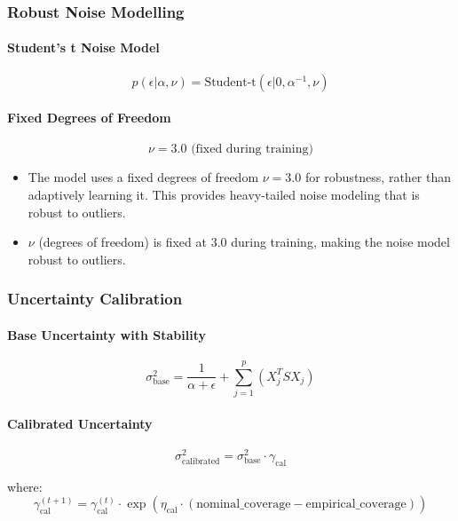 \subsubsection{Robust Noise Modelling}

\paragraph{Student's t Noise Model}
\[
p(\epsilon|\alpha,\nu) = \text{Student-t}(\epsilon|0,\alpha^{-1},\nu)
\]

\paragraph{Fixed Degrees of Freedom}
\[
\nu = 3.0 \text{ (fixed during training)}
\]

\begin{itemize}

\item The model uses a fixed degrees of freedom $\nu = 3.0$ for robustness, rather than adaptively learning it. This provides heavy-tailed noise modeling that is robust to outliers.

\item $\nu$ (degrees of freedom) is fixed at $3.0$ during training, making the noise model robust to outliers.
\end{itemize}

\subsubsection{Uncertainty Calibration}

\paragraph{Base Uncertainty with Stability}
\[
\sigma^2_{\text{base}} = \frac{1}{\alpha + \epsilon} + \sum_{j=1}^p (X_j^TSX_j)
\]

\paragraph{Calibrated Uncertainty}
\[
\sigma^2_{\text{calibrated}} = \sigma^2_{\text{base}} \cdot \gamma_{\text{cal}}
\]

where:
\[
\gamma_{\text{cal}}^{(t+1)} = \gamma_{\text{cal}}^{(t)} \cdot \exp(\eta_{\text{cal}} \cdot (\text{nominal\_coverage} - \text{empirical\_coverage}))
\]

